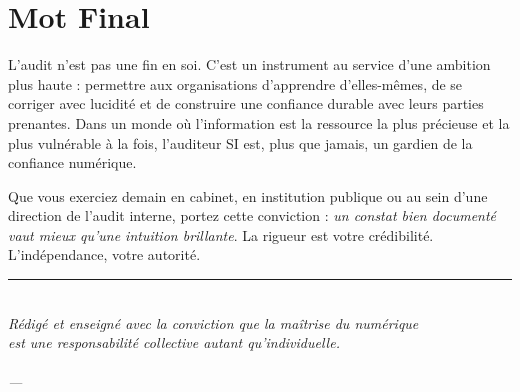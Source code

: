 \section*{Mot Final}

L'audit n'est pas une fin en soi. C'est un instrument au service d'une ambition plus haute : permettre aux organisations d'apprendre d'elles-mêmes, de se corriger avec lucidité et de construire une confiance durable avec leurs parties prenantes. Dans un monde où l'information est la ressource la plus précieuse et la plus vulnérable à la fois, l'auditeur SI est, plus que jamais, un gardien de la confiance numérique.

Que vous exerciez demain en cabinet, en institution publique ou au sein d'une direction de l'audit interne, portez cette conviction : \textit{un constat bien documenté vaut mieux qu'une intuition brillante}. La rigueur est votre crédibilité. L'indépendance, votre autorité.

\vspace{2ex}
\begin{center}
    {\color{CouleurAccent}\rule{0.6\linewidth}{1pt}}\\[0.8ex]
    {\small\itshape\color{CouleurPrimaire}
        Rédigé et enseigné avec la conviction que la maîtrise du numérique\\
        est une responsabilité collective autant qu'individuelle.}\\[0.5ex]
    {\small\bfseries\color{CouleurPrimaire}\auteurcours}\\
    {\footnotesize\color{CouleurBordInfo}\itshape\institutionprimaire{} --- \anneescolaire}
\end{center}
